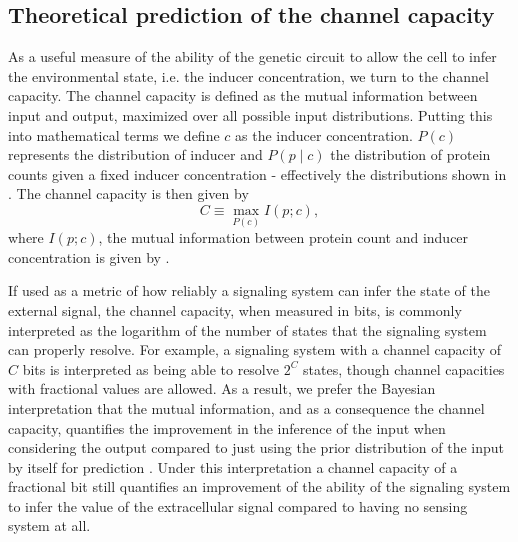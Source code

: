 \subsection{Theoretical prediction of the channel capacity}
\label{sec_channcap}

As a useful measure of the ability of the genetic circuit to allow the cell to
infer the environmental state, i.e. the inducer concentration, we turn to the
channel capacity. The channel capacity is defined as the mutual information
between input and output, maximized over all possible input distributions.
Putting this into mathematical terms we define $c$ as the inducer
concentration. $P(c)$ represents the distribution of inducer and $P(p \mid c)$
the distribution of protein counts given a fixed inducer concentration -
effectively the distributions shown in . The channel capacity
is then given by
\begin{equation}
  C \equiv \max_{P(c)} I(p; c),
  \label{eq_chann_cap}
\end{equation}
where $I(p; c)$, the mutual information between protein count and inducer
concentration is given by .

If used as a metric of how reliably a signaling system can infer the state of
the external signal, the channel capacity, when measured in bits, is commonly
interpreted as the logarithm of the number of states that the signaling system
can properly resolve. For example, a signaling system with a channel capacity
of $C$ bits is interpreted as being able to resolve $2^C$ states, though
channel capacities with fractional values are allowed. As a result, we prefer
the Bayesian interpretation that the mutual information, and as a consequence
the channel capacity, quantifies the improvement in the inference of the input
when considering the output compared to just using the prior distribution of
the input by itself for prediction \cite{Voliotis2014a, Bowsher2014}. Under
this interpretation a channel capacity of a fractional bit still quantifies an
improvement of the ability of the signaling system to infer the value of the
extracellular signal compared to having no sensing system at all.


